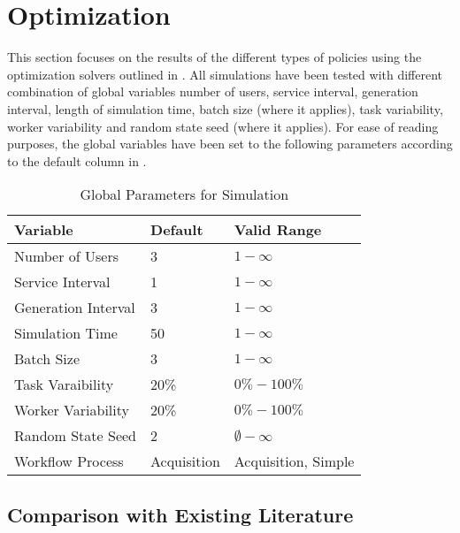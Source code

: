 \documentclass{seal_thesis}
\begin{document}

\section{Optimization}
\label{sec:op_results}

This section focuses on the results of the different types of policies using the optimization solvers outlined in . All simulations have been tested with different combination of global variables \ie number of users, service interval, generation interval, length of simulation time, batch size (where it applies), task variability, worker variability and random state seed (where it applies). For ease of reading purposes, the global variables have been set to the following parameters according to the default column in .

\begin{table}[htb]
\centering
\begin{tabular}{@{}lll@{}}
\toprule
Variable            & Default     & Valid Range \\ \midrule
Number of Users     & 3           & $1-\infty$      \\
Service Interval    & 1           & $1-\infty$      \\
Generation Interval & 3           & $1-\infty$      \\
Simulation Time     & 50          & $1-\infty$      \\
Batch Size          & 3           & $1-\infty$      \\
Task Varaibility    & 20\%        & $0\%-100\%$      \\
Worker Variability  & 20\%        & $0\%-100\%$      \\
Random State Seed   & 2           & $\emptyset-\infty$      \\
Workflow Process    & Acquisition & Acquisition, Simple      \\ \bottomrule
\end{tabular}
\caption{Global Parameters for Simulation}
\label{tab:global_parameters_sim}
\end{table}

\subsection{Comparison with Existing Literature}
\end{document}
